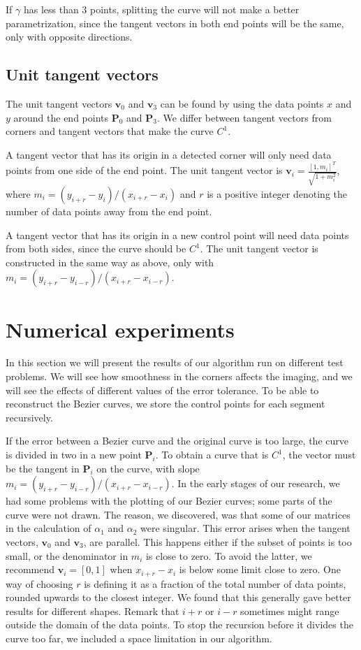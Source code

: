 \documentclass[10pt]{article}
\begin{document}
If $\gamma$ has less than 3 points, splitting the curve will not make a better parametrization, since the tangent vectors in both end points will be the same, only with opposite directions.


\subsection*{Unit tangent vectors}
The unit tangent vectors $\mathbf{v}_0$ and $\mathbf{v}_3$ can be found by using the data points $x$ and $y$ around the end points $\mathbf{P}_0$ and $\mathbf{P}_3$. We differ between tangent vectors from corners and tangent vectors that make the curve $C^1$.

A tangent vector that has its origin in a detected corner will only need data points from one side of the end point. The unit tangent vector is  $\mathbf{v}_i = \frac{[1, m_i]^T}{\sqrt{1+m_i^2}}$, where $m_i = (y_{i+r} - y_i)/(x_{i+r} - x_i)$ and $r$ is a positive integer denoting the number of data points away from the end point.

A tangent vector that has its origin in a new control point will need data points from both sides, since the curve should be $C^1$. The unit tangent vector is constructed in the same way as above, only with $m_i = (y_{i+r} - y_{i-r})/(x_{i+r} - x_{i-r})$.


\section*{Numerical experiments}

In this section we will present the results of our algorithm run on different test problems. We will see how smoothness in the corners affects the imaging, and we will see the effects of different values of the error tolerance. To be able to reconstruct the Bezier curves, we store the control points for each segment recursively.

If the error between a Bezier curve and the original curve is too large, the curve is divided in two in a new point $\mathbf{P}_i$. To obtain a curve that is $C^1$, the vector must be the tangent in $\mathbf{P}_i$ on the curve, with slope $m_i = (y_{i+r} - y_{i-r})/(x_{i+r} - x_{i-r})$. In the early stages of our research, we had some problems with the plotting of our Bezier curves; some parts of the curve were not drawn. The reason, we discovered, was that some of our matrices in the calculation of $\alpha_1$ and $\alpha_2$ were singular. This error arises when the tangent vectors, $\mathbf{v}_0$ and $\mathbf{v}_3$, are parallel. This happens either if the subset of points is too small, or the denominator in $m_i$ is close to zero. To avoid the latter, we recommend $\mathbf{v}_i = [0,1]$ when $x_{i+r} - x_i$ is below some limit close to zero. One way of choosing $r$ is defining it as a fraction of the total number of data points, rounded upwards to the closest integer. We found that this generally gave better results for different shapes. Remark that $i+r$ or $i-r$ sometimes might range outside the domain of the data points. To stop the recursion before it divides the curve too far, we included a space limitation in our algorithm. 
\end{document}
